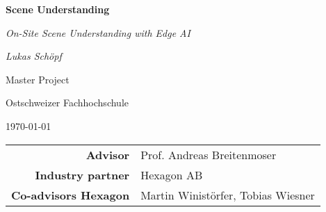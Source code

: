 %
%
%


\begin{titlepage}
    \centering

    {\huge \bfseries \sffamily Scene Understanding \par
     \normalfont\itshape On-Site Scene Understanding with Edge AI \par}
    \vspace{1cm}

    {\large \textsl{Lukas Schöpf}}
    \par
    \vspace{1cm}

    {\textsc Master Project \par}
    {Ostschweizer Fachhochschule \par}
    \today
    \vfill
    

    \vfill

    \begin{tabular}{rl}
        \bfseries\sffamily Advisor              & Prof. Andreas Breitenmoser \\
        \bfseries\sffamily Industry partner     & Hexagon AB \\
        \bfseries\sffamily Co-advisors Hexagon   & Martin Winistörfer, Tobias Wiesner \\
    \end{tabular}
    \restoregeometry    
\end{titlepage}

